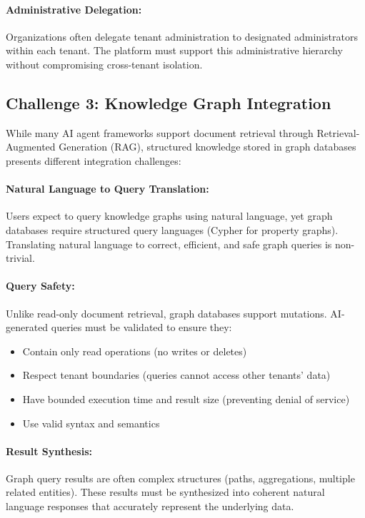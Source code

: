 \paragraph{Administrative Delegation:}
Organizations often delegate tenant administration to designated administrators within each tenant. The platform must support this administrative hierarchy without compromising cross-tenant isolation.

\subsection{Challenge 3: Knowledge Graph Integration}

While many AI agent frameworks support document retrieval through Retrieval-Augmented Generation (RAG), structured knowledge stored in graph databases presents different integration challenges:

\paragraph{Natural Language to Query Translation:}
Users expect to query knowledge graphs using natural language, yet graph databases require structured query languages (Cypher for property graphs). Translating natural language to correct, efficient, and safe graph queries is non-trivial.

\paragraph{Query Safety:}
Unlike read-only document retrieval, graph databases support mutations. AI-generated queries must be validated to ensure they:
\begin{itemize}
    \item Contain only read operations (no writes or deletes)
    \item Respect tenant boundaries (queries cannot access other tenants' data)
    \item Have bounded execution time and result size (preventing denial of service)
    \item Use valid syntax and semantics
\end{itemize}

\paragraph{Result Synthesis:}
Graph query results are often complex structures (paths, aggregations, multiple related entities). These results must be synthesized into coherent natural language responses that accurately represent the underlying data.

